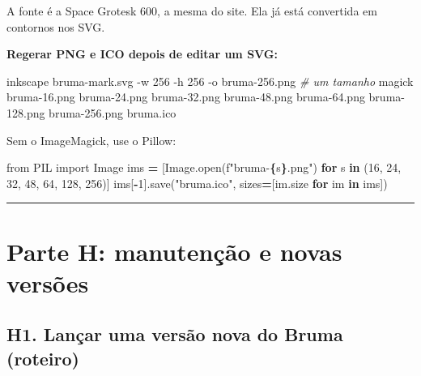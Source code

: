 \documentclass[
  10pt,
]{article}
\newenvironment{Shaded}{\begin{snugshade}}{\end{snugshade}}
\newcommand{\AttributeTok}[1]{\textcolor[rgb]{0.13,0.29,0.53}{#1}}
\newcommand{\BuiltInTok}[1]{#1}
\newcommand{\CommentTok}[1]{\textcolor[rgb]{0.56,0.35,0.01}{\textit{#1}}}
\newcommand{\ControlFlowTok}[1]{\textcolor[rgb]{0.13,0.29,0.53}{\textbf{#1}}}
\newcommand{\DecValTok}[1]{\textcolor[rgb]{0.00,0.00,0.81}{#1}}
\newcommand{\ExtensionTok}[1]{#1}
\newcommand{\ImportTok}[1]{#1}
\newcommand{\KeywordTok}[1]{\textcolor[rgb]{0.13,0.29,0.53}{\textbf{#1}}}
\newcommand{\NormalTok}[1]{#1}
\newcommand{\OperatorTok}[1]{\textcolor[rgb]{0.81,0.36,0.00}{\textbf{#1}}}
\newcommand{\SpecialCharTok}[1]{\textcolor[rgb]{0.81,0.36,0.00}{\textbf{#1}}}
\newcommand{\SpecialStringTok}[1]{\textcolor[rgb]{0.31,0.60,0.02}{#1}}
\newcommand{\StringTok}[1]{\textcolor[rgb]{0.31,0.60,0.02}{#1}}
\begin{document}
A fonte é a Space Grotesk 600, a mesma do site. Ela já está convertida
em contornos nos SVG.

\textbf{Regerar PNG e ICO depois de editar um SVG:}

\begin{Shaded}
\begin{Highlighting}[]
\ExtensionTok{inkscape}\NormalTok{ bruma{-}mark.svg }\AttributeTok{{-}w}\NormalTok{ 256 }\AttributeTok{{-}h}\NormalTok{ 256 }\AttributeTok{{-}o}\NormalTok{ bruma{-}256.png          }\CommentTok{\# um tamanho}
\ExtensionTok{magick}\NormalTok{ bruma{-}16.png bruma{-}24.png bruma{-}32.png bruma{-}48.png bruma{-}64.png bruma{-}128.png bruma{-}256.png bruma.ico}
\end{Highlighting}
\end{Shaded}

Sem o ImageMagick, use o Pillow:

\begin{Shaded}
\begin{Highlighting}[]
\ImportTok{from}\NormalTok{ PIL }\ImportTok{import}\NormalTok{ Image}
\NormalTok{ims }\OperatorTok{=}\NormalTok{ [Image.}\BuiltInTok{open}\NormalTok{(}\SpecialStringTok{f"bruma{-}}\SpecialCharTok{\{}\NormalTok{s}\SpecialCharTok{\}}\SpecialStringTok{.png"}\NormalTok{) }\ControlFlowTok{for}\NormalTok{ s }\KeywordTok{in}\NormalTok{ (}\DecValTok{16}\NormalTok{, }\DecValTok{24}\NormalTok{, }\DecValTok{32}\NormalTok{, }\DecValTok{48}\NormalTok{, }\DecValTok{64}\NormalTok{, }\DecValTok{128}\NormalTok{, }\DecValTok{256}\NormalTok{)]}
\NormalTok{ims[}\OperatorTok{{-}}\DecValTok{1}\NormalTok{].save(}\StringTok{"bruma.ico"}\NormalTok{, sizes}\OperatorTok{=}\NormalTok{[im.size }\ControlFlowTok{for}\NormalTok{ im }\KeywordTok{in}\NormalTok{ ims])}
\end{Highlighting}
\end{Shaded}

\begin{center}\rule{0.5\linewidth}{0.5pt}\end{center}

\hypertarget{parte-h-manutenuxe7uxe3o-e-novas-versuxf5es}{%
\section{Parte H: manutenção e novas
versões}\label{parte-h-manutenuxe7uxe3o-e-novas-versuxf5es}}

\hypertarget{h1.-lanuxe7ar-uma-versuxe3o-nova-do-bruma-roteiro}{%
\subsection{H1. Lançar uma versão nova do Bruma
(roteiro)}\label{h1.-lanuxe7ar-uma-versuxe3o-nova-do-bruma-roteiro}}
\end{document}

